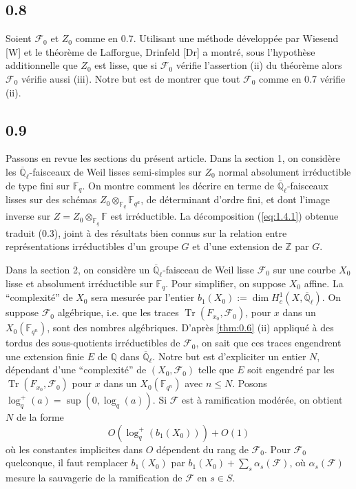 \documentclass[10pt,a4paper]{article}
\theoremstyle{plain}
\theoremstyle{definition}
\DeclareMathOperator{\tr}{Tr}
\begin{document}
\subsection*{0.8}

Soient $\mathcal{F}_0$ et $Z_0$ comme en 0.7. Utilisant une m\'ethode d\'evelopp\'ee par Wiesend [W] et le th\'eor\`eme de Lafforgue, Drinfeld [Dr] a montr\'e, sous l'hypoth\`ese additionnelle que $Z_0$ est lisse, que si $\mathcal{F}_0$ v\'erifie l'assertion (ii) du th\'eor\`eme alors $\mathcal{F}_0$ v\'erifie aussi (iii). Notre but est de montrer que tout $\mathcal{F}_0$ comme en 0.7 v\'erifie (ii).

\subsection*{0.9}

Passons en revue les sections du pr\'esent article. Dans la section 1, on consid\`ere les $\overline{\mathbb{Q}}_\ell$-faisceaux de Weil lisses semi-simples sur $Z_0$ normal absolument irr\'eductible de type fini sur $\mathbb{F}_q$. On montre comment les d\'ecrire en terme de $\overline{\mathbb{Q}}_\ell$-faisceaux lisses sur des sch\'emas $Z_0 \otimes_{\mathbb{F}_q} \mathbb{F}_{q^a}$, de d\'eterminant d'ordre fini, et dont l'image inverse sur $Z = Z_0 \otimes_{\mathbb{F}_q} \mathbb{F}$ est irr\'eductible. La d\'ecomposition (\ref{eq:1.4.1}) obtenue traduit (0.3), joint \`a des r\'esultats bien connus sur la relation entre repr\'esentations irr\'eductibles d'un groupe $G$ et d'une extension de $\mathbb{Z}$ par $G$.

Dans la section 2, on consid\`ere un $\overline{\mathbb{Q}}_\ell$-faisceau de Weil lisse $\mathcal{F}_0$ sur une courbe $X_0$ lisse et absolument irr\'eductible sur $\mathbb{F}_q$. Pour simplifier, on suppose $X_0$ affine. La ``complexit\'e'' de $X_0$ sera mesur\'ee par l'entier $b_1(X_0) := \dim H_c^1(X, \overline{\mathbb{Q}}_\ell)$. On suppose $\mathcal{F}_0$ alg\'ebrique, i.e. que les traces $\tr(F_{x_0},\mathcal{F}_0)$, pour $x$ dans un $X_0(\mathbb{F}_{q^n})$, sont des nombres alg\'ebriques. D'apr\`es \ref{thm:0.6} (ii) appliqu\'e \`a des tordus des sous-quotients irr\'eductibles de $\mathcal{F}_0$, on sait que ces traces engendrent une extension finie $E$ de $\mathbb{Q}$ dans $\overline{\mathbb{Q}}_\ell$. Notre but est d'expliciter un entier $N$, d\'ependant d'une ``complexit\'e'' de $(X_0,\mathcal{F}_0)$ telle que $E$ soit engendr\'e par les $\tr(F_{x_0},\mathcal{F}_0)$ pour $x$ dans un $X_0(\mathbb{F}_{q^n})$ avec $n \leq N$. Posons $\log_q^+(a) = \sup(0, \log_q(a))$. Si $\mathcal{F}$ est \`a ramification mod\'er\'ee, on obtient $N$ de la forme
\begin{equation}\label{eq:0.9.1}
O(\log_q^+(b_1(X_0))) + O(1)
\end{equation}
o\`u les constantes implicites dans $O$ d\'ependent du rang de $\mathcal{F}_0$. Pour $\mathcal{F}_0$ quelconque, il faut remplacer $b_1(X_0)$ par $b_1(X_0) + \sum_s \alpha_s(\mathcal{F})$, o\`u $\alpha_s(\mathcal{F})$ mesure la sauvagerie de la ramification de $\mathcal{F}$ en $s \in S$.
\end{document}

